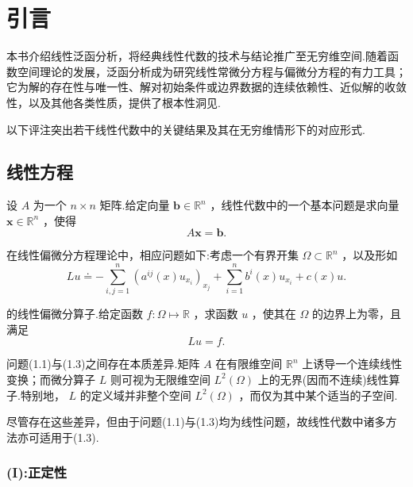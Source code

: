 \chapter{引言}

本书介绍线性泛函分析，将经典线性代数的技术与结论推广至无穷维空间.随着函数空间理论的发展，泛函分析成为研究线性常微分方程与偏微分方程的有力工具；它为解的存在性与唯一性、解对初始条件或边界数据的连续依赖性、近似解的收敛性，以及其他各类性质，提供了根本性洞见.

以下评注突出若干线性代数中的关键结果及其在无穷维情形下的对应形式.

\section{线性方程}

设 $A$ 为一个 $n \times  n$ 矩阵.给定向量 $\bm{b} \in  {\mathbb{R}}^{n}$ ，线性代数中的一个基本问题是求向量 $\bm{x} \in  {\mathbb{R}}^{n}$ ，使得
\begin{equation}\tag{1.1}
A\bm{x} = \bm{b}.
\end{equation}


在线性偏微分方程理论中，相应问题如下:考虑一个有界开集 $\Omega  \subset  {\mathbb{R}}^{n}$ ，以及形如
\begin{equation}\tag{1.2}
{Lu} \doteq   - \mathop{\sum }\limits_{{i,j = 1}}^{n}{\left( {a}^{ij}\left( x\right) {u}_{{x}_{i}}\right) }_{{x}_{j}} + \mathop{\sum }\limits_{{i = 1}}^{n}{b}^{i}\left( x\right) {u}_{{x}_{i}} + c\left( x\right) u.
\end{equation}

的线性偏微分算子.给定函数 $f : \Omega  \mapsto  \mathbb{R}$ ，求函数 $u$ ，使其在 $\Omega$ 的边界上为零，且满足
\begin{equation}\tag{1.3}
{Lu} = f.
\end{equation}

问题(1.1)与(1.3)之间存在本质差异.矩阵 $A$ 在有限维空间 ${\mathbb{R}}^{n}$ 上诱导一个连续线性变换；而微分算子 $L$ 则可视为无限维空间 $L^2\left( \Omega \right)$ 上的无界(因而不连续)线性算子.特别地， $L$ 的定义域并非整个空间 $L^2\left( \Omega \right)$ ，而仅为其中某个适当的子空间.

尽管存在这些差异，但由于问题(1.1)与(1.3)均为线性问题，故线性代数中诸多方法亦可适用于(1.3).

\subsection*{(I):正定性}\par

